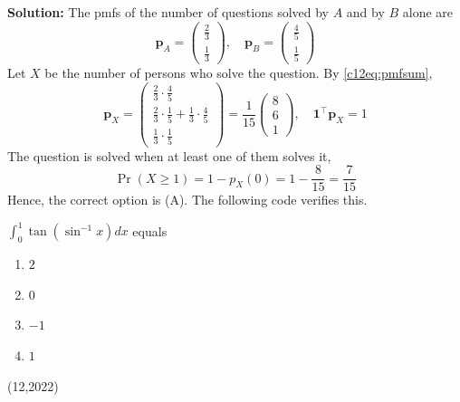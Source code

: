 \textbf{Solution:} The pmfs of the number of questions solved by $A$ and by $B$ alone are
\begin{equation}
\mathbf{p}_A = \begin{pmatrix} \frac{2}{3} \\ \frac{1}{3} \end{pmatrix}, \quad
\mathbf{p}_B = \begin{pmatrix} \frac{4}{5} \\ \frac{1}{5} \end{pmatrix}
\end{equation}
Let $X$ be the number of persons who solve the question. By \eqref{c12eq:pmfsum},
\begin{equation}
\mathbf{p}_X = \begin{pmatrix} \frac{2}{3}\cdot\frac{4}{5} \\ \frac{2}{3}\cdot\frac{1}{5} + \frac{1}{3}\cdot\frac{4}{5} \\ \frac{1}{3}\cdot\frac{1}{5} \end{pmatrix} = \frac{1}{15}\begin{pmatrix} 8 \\ 6 \\ 1 \end{pmatrix}, \quad \mathbf{1}^{\top}\mathbf{p}_X = 1
\end{equation}
The question is solved when at least one of them solves it,
\begin{equation}
\Pr(X \ge 1) = 1 - p_X(0) = 1 - \frac{8}{15} = \frac{7}{15}
\end{equation}
Hence, the correct option is (A). The following code verifies this.

\nopagebreak[4]
\begin{center}
\end{center}

\item $\displaystyle\int_0^1 \tan\left(\sin^{-1}x\right)dx$ equals
\begin{enumerate}[label=(\alph*), noitemsep]
\item $2$
\item $0$
\item $-1$
\item $1$
\end{enumerate}
\hfill (12,2022)


